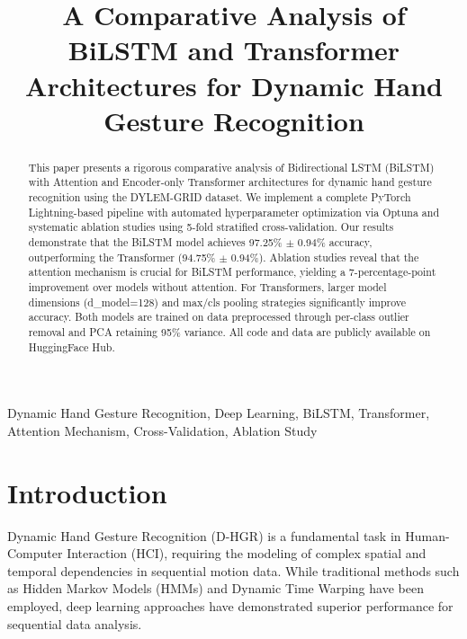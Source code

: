 \documentclass[conference]{IEEEtran}
\begin{document}
\title{A Comparative Analysis of BiLSTM and Transformer Architectures for Dynamic Hand Gesture Recognition}

\author{
\and
{}
}

\maketitle

\begin{abstract}
This paper presents a rigorous comparative analysis of Bidirectional LSTM (BiLSTM) with Attention and Encoder-only Transformer architectures for dynamic hand gesture recognition using the DYLEM-GRID dataset. We implement a complete PyTorch Lightning-based pipeline with automated hyperparameter optimization via Optuna and systematic ablation studies using 5-fold stratified cross-validation. Our results demonstrate that the BiLSTM model achieves 97.25\% $\pm$ 0.94\% accuracy, outperforming the Transformer (94.75\% $\pm$ 0.94\%). Ablation studies reveal that the attention mechanism is crucial for BiLSTM performance, yielding a 7-percentage-point improvement over models without attention. For Transformers, larger model dimensions (d\_model=128) and max/cls pooling strategies significantly improve accuracy. Both models are trained on data preprocessed through per-class outlier removal and PCA retaining 95\% variance. All code and data are publicly available on HuggingFace Hub.
\end{abstract}

\begin{IEEEkeywords}
Dynamic Hand Gesture Recognition, Deep Learning, BiLSTM, Transformer, Attention Mechanism, Cross-Validation, Ablation Study
\end{IEEEkeywords}

\section{Introduction}

Dynamic Hand Gesture Recognition (D-HGR) is a fundamental task in Human-Computer Interaction (HCI), requiring the modeling of complex spatial and temporal dependencies in sequential motion data. While traditional methods such as Hidden Markov Models (HMMs) \cite{rabiner1989} and Dynamic Time Warping have been employed, deep learning approaches have demonstrated superior performance for sequential data analysis.
\end{document}
